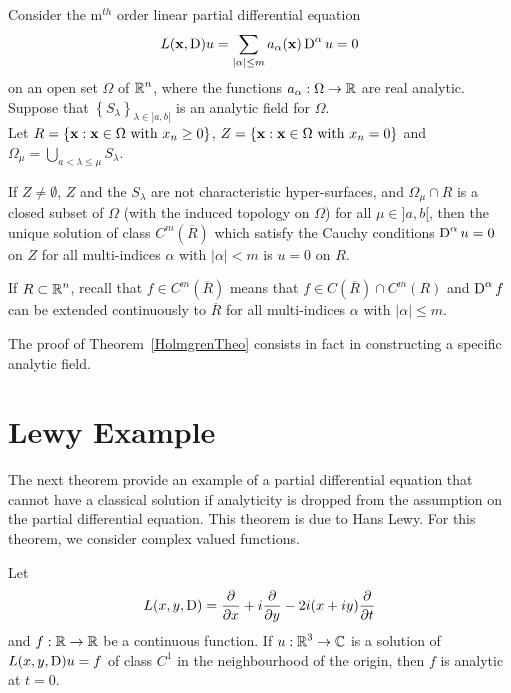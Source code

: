 \begin{theorem}[Holmgren]
Consider the m$^{th}$ order linear partial differential equation
\[
L(\mathbf{x}, \operatorname{D})u = \sum_{|\alpha|\leq m} a_\alpha(\mathbf{x}) \operatorname{D}^\alpha u = 0
\]
on an open set $\Omega$ of $\displaystyle \mathbb{R}^n$, where the functions
$a_\alpha:\Omega\rightarrow \mathbb{R}$ are real analytic. Suppose that
$\displaystyle \left\{ S_\lambda \right\}_{\lambda \in ]a,b[}$ is an
analytic field for $\Omega$.\\
Let
$\displaystyle
R = \left\{ \mathbf{x} : \mathbf{x} \in \Omega \ \text{with} \ x_n\geq 0 \right\}$,
$\displaystyle
Z = \left\{ \mathbf{x} : \mathbf{x} \in \Omega \ \text{with} \ x_n = 0 \right\}$
and
$\displaystyle \Omega_\mu = \bigcup_{a<\lambda \leq \mu} S_\lambda$.

If $Z \neq \emptyset$, $Z$ and the $S_\lambda$ are not characteristic
hyper-surfaces, and
$\Omega_\mu \cap R$ is a closed subset of $\Omega$ (with
the induced topology on $\Omega$) for all $\mu \in ]a,b[$, then the
unique solution of class $\displaystyle C^m(\overline{R})$ which
satisfy the Cauchy conditions $\displaystyle \operatorname{D}^\alpha u = 0$ on
$Z$ for all multi-indices $\alpha$ with $|\alpha|<m$ is $u=0$ on $R$.
\end{theorem}

If $\displaystyle R\subset \mathbb{R}^n$, recall that
$\displaystyle f \in C^m(\overline{R})$ means that
$\displaystyle f\in C(\overline{R}) \cap C^m(R)$ and
$\displaystyle \operatorname{D}^\alpha f$ can be extended
continuously to $\overline{R}$ for all multi-indices $\alpha$ with
$|\alpha|\leq m$.

The proof of Theorem~\ref{HolmgrenTheo} consists in fact in
constructing a specific analytic field.

\section{Lewy Example}

The next theorem provide an example of a partial differential equation
that cannot have a classical solution  if analyticity is dropped from
the assumption on the partial differential equation.  This theorem is
due to Hans Lewy.  For this theorem, we consider complex valued
functions.

\begin{theorem}[Lewy] \label{Lewy}
Let
\[
L(x,y,\operatorname{D}) = \frac{\partial{}}{\partial x} + i \frac{\partial{}}{\partial y} - 2i(x+iy)\frac{\partial{}}{\partial t}
\]
and $f:\mathbb{R}\to \mathbb{R}$ be a continuous function.  If
$\displaystyle u:\mathbb{R}^3\to \mathbb{C}$ is a
solution of $L(x,y,\operatorname{D})u = f$ of class $\displaystyle C^1$ in the
neighbourhood of the origin, then $f$ is analytic at $t=0$.
\end{theorem}

